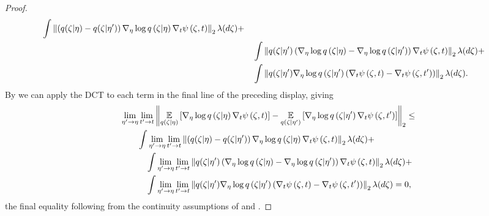 \begin{lem}
\begin{proof}
\begin{align*}
%
\int \norm{
\left(\q(\zeta \vert \eta) - \q(\zeta \vert \eta')\right)
    \lqgrad{\zeta \vert \eta} \psigrad{\zeta, \t}
}_2 \lambda(d\zeta) + \\&\quad
%
\int \norm{
\q(\zeta \vert \eta')
    \left( \lqgrad{\zeta \vert \eta} - \lqgrad{\zeta \vert \eta'} \right)
    \psigrad{\zeta, \t}
}_2 \lambda(d\zeta) + \\&\quad
%
\int \norm{
\q(\zeta \vert \eta')\lqgrad{\zeta \vert \eta'}
    \left( \psigrad{\zeta, \t} - \psigrad{\zeta, \t'} \right)
}_2 \lambda(d\zeta).
%
\end{align*}
%
By  we can apply the DCT to each
term in the final line of the preceding display, giving
%
\begin{align*}
%
\MoveEqLeft
\lim_{\eta' \rightarrow \eta} \lim_{\t' \rightarrow \t}
\norm{\expect{\q(\zeta \vert \eta)}
       {\lqgrad{\zeta \vert \eta} \psigrad{\zeta,\t}} -
   \expect{\q(\zeta \vert \eta')}
          {\lqgrad{\zeta \vert \eta'} \psigrad{\zeta,\t'}}
      }_2 \le\\&
%
\int \lim_{\eta' \rightarrow \eta} \lim_{\t' \rightarrow \t} \norm{
\left(\q(\zeta \vert \eta) - \q(\zeta \vert \eta')\right)
    \lqgrad{\zeta \vert \eta} \psigrad{\zeta, \t}
}_2 \lambda(d\zeta) + \\&\quad
%
\int \lim_{\eta' \rightarrow \eta} \lim_{\t' \rightarrow \t} \norm{
\q(\zeta \vert \eta')
    \left( \lqgrad{\zeta \vert \eta} - \lqgrad{\zeta \vert \eta'} \right)
    \psigrad{\zeta, \t}
}_2 \lambda(d\zeta) + \\&\quad
%
\int \lim_{\eta' \rightarrow \eta} \lim_{\t' \rightarrow \t} \norm{
\q(\zeta \vert \eta')\lqgrad{\zeta \vert \eta'}
    \left( \psigrad{\zeta, \t} - \psigrad{\zeta, \t'} \right)
}_2 \lambda(d\zeta) = 0,
%
\end{align*}
%
the final equality following from the continuity assumptions of
 and .
%
\end{proof}
%
\end{lem}
